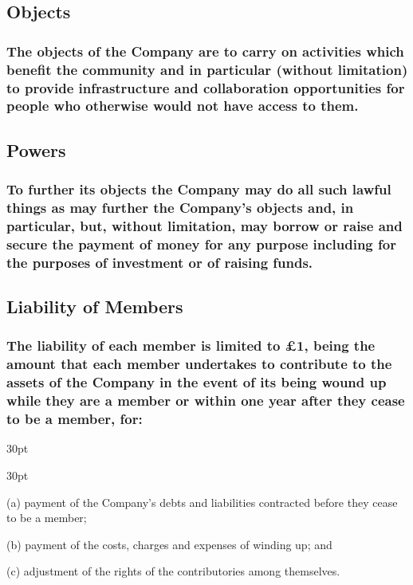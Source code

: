 \documentclass[12pt]{article}
\def\clauseindent{30pt}
\newenvironment{subindentlist}{\raggedright\begin{adjustwidth}{\clauseindent}{}\begin{labeledlist}{\clauseindent}}{\end{labeledlist}\end{adjustwidth}}
\begin{document}
\subsection{Objects}
\subsubsection[Broad Objective of the Company and Hackerspace]{The objects of the Company are to carry on activities which benefit the community and in particular (without limitation) to provide infrastructure and collaboration opportunities for people who otherwise would not have access to them.}

\subsection{Powers}
\subsubsection[Broad Powers of the Company and Hackerspace]{To further its objects the Company may do all such lawful things as may further the Company's objects and, in particular, but, without limitation, may borrow or raise and secure the payment of money for any purpose including for the purposes of investment or of raising funds.}

\subsection{Liability of Members}
\subsubsection[Liability of Members is \pounds{1}]{The liability of each member is limited to \pounds{1}, being the amount that each member undertakes to contribute to the assets of the Company in the event of its being wound up while they are a member or within one year after they cease to be a member, for:}
\begin{subindentlist}
  \item [(a)] payment of the Company's debts and liabilities contracted before they cease to be a member;
  \item [(b)] payment of the costs, charges and expenses of winding up; and
  \item [(c)] adjustment of the rights of the contributories among themselves.
\end{subindentlist}
\end{document}
